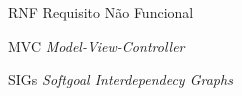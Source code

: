 \begin{siglas}
  \item[RNF] Requisito Não Funcional
  \item[MVC] \textit{Model-View-Controller}
  \item[SIGs] \textit{Softgoal Interdependecy Graphs}
\end{siglas}
